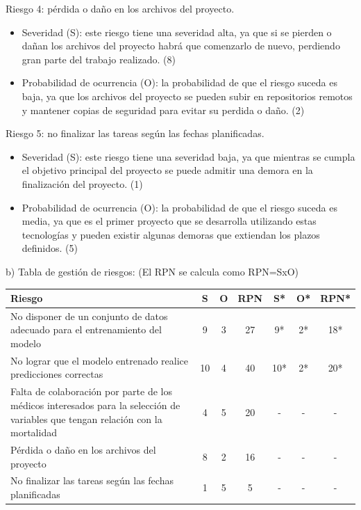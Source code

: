 \documentclass[
11pt, %
]{charter}
\begin{document}
Riesgo 4: pérdida o daño en los archivos del proyecto.
\begin{itemize}
	\item Severidad (S): este riesgo tiene una severidad alta, ya que si se pierden o dañan los archivos del proyecto habrá que comenzarlo de nuevo, perdiendo gran parte del trabajo realizado. (8)
	\item Probabilidad de ocurrencia (O): la probabilidad de que el riesgo suceda es baja, ya que los archivos del proyecto se pueden subir en repositorios remotos y mantener copias de seguridad para evitar su perdida o daño. (2)
\end{itemize} 

Riesgo 5: no finalizar las tareas según las fechas planificadas.
\begin{itemize}
	\item Severidad (S): este riesgo tiene una severidad baja, ya que mientras se cumpla el objetivo principal del proyecto se puede admitir una demora en la finalización del proyecto. (1)
	\item Probabilidad de ocurrencia (O): la probabilidad de que el riesgo suceda es media, ya que es el primer proyecto que se desarrolla utilizando estas tecnologías y pueden existir algunas demoras que extiendan los plazos definidos. (5)
\end{itemize}

b) Tabla de gestión de riesgos:      (El RPN se calcula como RPN=SxO)

\begin{table}[htpb]
\centering
\begin{tabularx}{\linewidth}{@{}|X|c|c|c|c|c|c|@{}}
\hline
\rowcolor[HTML]{C0C0C0} 
Riesgo & S & O & RPN & S* & O* & RPN* \\ \hline
No disponer de un conjunto de datos adecuado para el entrenamiento del modelo & 9 & 3 & 27 & 9* & 2* & 18* \\ \hline
No lograr que el modelo entrenado realice predicciones correctas & 10 & 4 & 40 & 10* & 2* & 20* \\ \hline
Falta de colaboración por parte de los médicos interesados para la selección de variables que tengan relación con la mortalidad        & 4 & 5 & 20 & - & - & - \\ \hline
Pérdida o daño en los archivos del proyecto & 8 & 2 & 16 & - & - & - \\ \hline
No finalizar las tareas según las fechas planificadas & 1  & 5 & 5 & - & - & - \\ \hline
\end{tabularx}%
\end{table}
\end{document}
